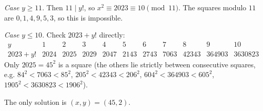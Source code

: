 \emph{Case $y\ge11$.} Then $11\mid y!$, so $x^2\equiv2023\equiv10\pmod{11}$. The squares modulo $11$ are $0,1,4,9,5,3$, so this is impossible.

\emph{Case $y\le10$.} Check $2023+y!$ directly:
\[\begin{array}{c|cccccccccc}y&1&2&3&4&5&6&7&8&9&10\\\hline 2023+y!&2024&2025&2029&2047&2143&2743&7063&42343&364903&3630823\end{array}\]
Only $2025=45^2$ is a square (the others lie strictly between consecutive squares, e.g. $84^2<7063<85^2$, $205^2<42343<206^2$, $604^2<364903<605^2$, $1905^2<3630823<1906^2$).

The only solution is $\boxed{(x,y)=(45,2)}$.
